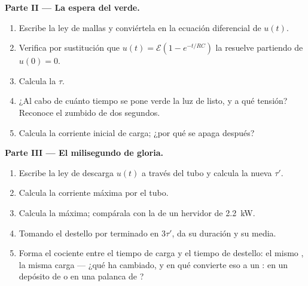 \begin{problem}
\medskip
\noindent\textbf{Parte II --- La espera del verde.}
\begin{enumerate}[resume]
  \item Escribe la ley de mallas y conviértela en la ecuación diferencial de $u(t)$.
  \item Verifica por sustitución que $u(t) = \mathcal{E}(1 - e^{-t/RC})$ la resuelve
        partiendo de $u(0) = 0$.
  \item Calcula la  $\tau$.
  \item ¿Al cabo de cuánto tiempo se pone verde la luz de listo, y a qué tensión?
        Reconoce el zumbido de dos segundos.
  \item Calcula la corriente inicial de carga; ¿por qué se apaga después?
\end{enumerate}

\medskip
\noindent\textbf{Parte III --- El milisegundo de gloria.}
\begin{enumerate}[resume]
  \item Escribe la ley de descarga $u(t)$ a través del tubo y calcula la nueva
         $\tau'$.
  \item Calcula la corriente máxima por el tubo.
  \item Calcula la  máxima; compárala con la de un hervidor de \qty{2.2}{kW}.
  \item Tomando el destello por terminado en $3\tau'$, da su duración y su 
        media.
  \item Forma el cociente entre el tiempo de carga y el tiempo de destello: el mismo
        , la misma carga --- ¿qué ha cambiado, y en qué convierte eso a un
        : en un depósito de  o en una palanca de ?
\end{enumerate}


\end{problem}
